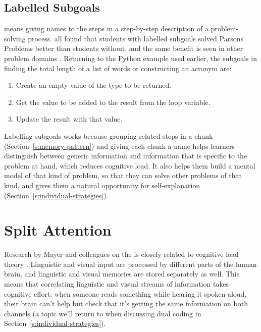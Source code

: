 \subsection*{Labelled Subgoals}

 means giving names
to the steps in a step-by-step description of a problem-solving process.
\cite{Marg2016,Morr2016} all found that students with labelled
subgoals solved Parsons Problems better than students without, and the
same benefit is seen in other problem domains \cite{Marg2012}.
Returning to the Python example used earlier, the subgoals in finding
the total length of a list of words or constructing an acronym are:

\begin{enumerate}
\item
  Create an empty value of the type to be returned.
\item
  Get the value to be added to the result from the loop variable.
\item
  Update the result with that value.
\end{enumerate}

Labelling subgoals works because grouping related steps in a chunk
(Section~\ref{s:memory-pattern}) and giving each chunk a name helps
learners distinguish between generic information and information that is
specific to the problem at hand, which reduces cognitive load. It also
helps them build a mental model of that kind of problem, so that they
can solve other problems of that kind, and gives them a natural
opportunity for self-explanation (Section~\ref{s:individual-strategies}).

\section{Split Attention}\label{s:load-split-attention}

Research by Mayer and colleagues on the
 is
closely related to cognitive load theory \cite{Maye2003}. Linguistic
and visual input are processed by different parts of the human brain,
and linguistic and visual memories are stored separately as well. This
means that correlating linguistic and visual streams of information
takes cognitive effort: when someone reads something while hearing it
spoken aloud, their brain can't help but check that it's getting the
same information on both channels (a topic we'll return to when
discussing dual coding in Section~\ref{s:individual-strategies}).

